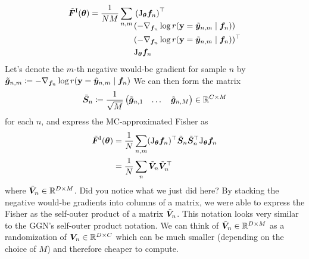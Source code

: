 \begin{align*}
  \tilde{{\bm{F}}}^{\text{I}}({\bm{\theta}})
  = \frac{1}{NM} \sum_{n,m}
  \begin{aligned}[t]
     & \left(\mathrm{J}_{{\bm{\theta}}}{\bm{f}}_n\right)^{\top}                              \\
     & (-\nabla_{{\bm{f}}_n} \log r({\mathbf{y}} = \tilde{{\bm{y}}}_{n,m} \mid {\bm{f}}_n))        \\
     & (-\nabla_{{\bm{f}}_n} \log r({\mathbf{y}} = \tilde{{\bm{y}}}_{n,m} \mid {\bm{f}}_n))^{\top} \\
     & \mathrm{J}_{{\bm{\theta}}}{\bm{f}}_n
  \end{aligned}
\end{align*}
Let's denote the $m$-th negative would-be gradient for sample $n$ by $\tilde{{\bm{g}}}_{n,m} \coloneq -\nabla_{{\bm{f}}_n} \log r({\mathbf{y}} = \tilde{{\bm{y}}}_{n,m} \mid {\bm{f}}_n)$
We can then form the matrix
\begin{align*}
  \tilde{{\bm{S}}}_n
  \coloneq
  \frac{1}{\sqrt{M}}
  \begin{pmatrix}
    \tilde{{\bm{g}}}_{n,1} & \dots & \tilde{{\bm{g}}}_{n,M}
  \end{pmatrix}
  \in {\mathbb{R}}^{C \times M}
\end{align*}
for each $n$, and express the MC-approximated Fisher as
\begin{align*}
  \tilde{{\bm{F}}}^{\text{I}}({\bm{\theta}})
   & =
  \frac{1}{N} \sum_{n,m}
  (\mathrm{J}_{{\bm{\theta}}}{\bm{f}}_n)^{\top}
  \tilde{{\bm{S}}}_n
  \tilde{{\bm{S}}}_n^{\top}
  \mathrm{J}_{{\bm{\theta}}}{\bm{f}}_n
  \\
   & =
  \frac{1}{N} \sum_n
  \tilde{{\bm{V}}}_n
  \tilde{{\bm{V}}}_n^{\top}
\end{align*}
where $\tilde{{\bm{V}}}_n \in {\mathbb{R}}^{D \times M}$.
Did you notice what we just did here?
By stacking the negative would-be gradients into columns of a matrix, we were able to express the Fisher as the self-outer product of a matrix $\tilde{{\bm{V}}}_n$.
This notation looks very similar to the GGN's self-outer product notation.
We can think of $\tilde{{\bm{V}}}_n \in {\mathbb{R}}^{D \times M}$ as a randomization of ${\bm{V}}_n \in {\mathbb{R}}^{D \times C}$ which can be much smaller (depending on the choice of $M$) and therefore cheaper to compute.

